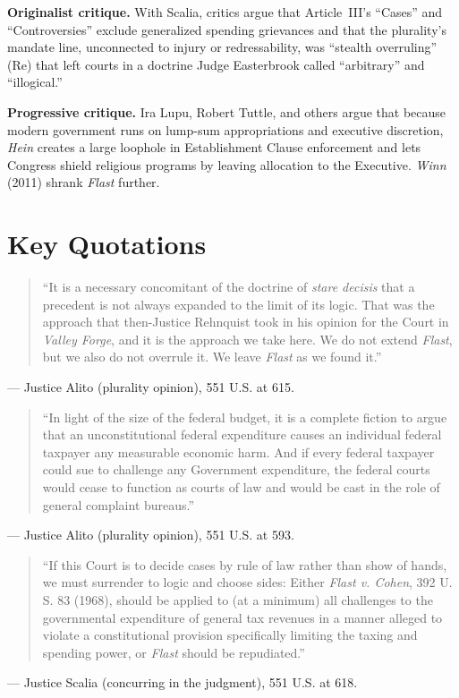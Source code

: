 \documentclass[12pt]{article}
\begin{document}
\textbf{Originalist critique.} With Scalia, critics argue that Article~III's ``Cases'' and ``Controversies'' exclude generalized spending grievances and that the plurality's mandate line, unconnected to injury or redressability, was ``stealth overruling'' (Re) that left courts in a doctrine Judge Easterbrook called ``arbitrary'' and ``illogical.''

\textbf{Progressive critique.} Ira Lupu, Robert Tuttle, and others argue that because modern government runs on lump-sum appropriations and executive discretion, \textit{Hein} creates a large loophole in Establishment Clause enforcement and lets Congress shield religious programs by leaving allocation to the Executive. \textit{Winn} (2011) shrank \textit{Flast} further.

\section{Key Quotations}

\begin{quote}
``It is a necessary concomitant of the doctrine of \textit{stare decisis} that a precedent is not always expanded to the limit of its logic. That was the approach that then-Justice Rehnquist took in his opinion for the Court in \textit{Valley Forge}, and it is the approach we take here. We do not extend \textit{Flast}, but we also do not overrule it. We leave \textit{Flast} as we found it.''
\end{quote}
\noindent --- Justice Alito (plurality opinion), 551 U.S. at 615.

\begin{quote}
``In light of the size of the federal budget, it is a complete fiction to argue that an unconstitutional federal expenditure causes an individual federal taxpayer any measurable economic harm. And if every federal taxpayer could sue to challenge any Government expenditure, the federal courts would cease to function as courts of law and would be cast in the role of general complaint bureaus.''
\end{quote}
\noindent --- Justice Alito (plurality opinion), 551 U.S. at 593.

\begin{quote}
``If this Court is to decide cases by rule of law rather than show of hands, we must surrender to logic and choose sides: Either \textit{Flast v. Cohen}, 392 U. S. 83 (1968), should be applied to (at a minimum) all challenges to the governmental expenditure of general tax revenues in a manner alleged to violate a constitutional provision specifically limiting the taxing and spending power, or \textit{Flast} should be repudiated.''
\end{quote}
\noindent --- Justice Scalia (concurring in the judgment), 551 U.S. at 618.
\end{document}
